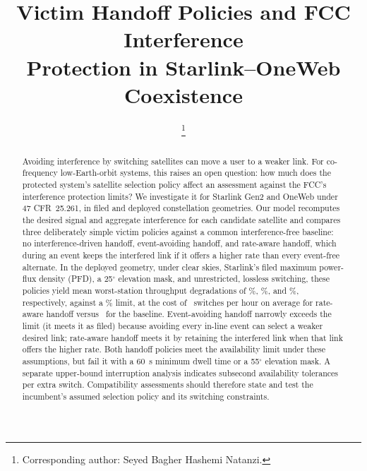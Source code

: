 \documentclass[conference]{IEEEtran}
\begin{document}
\title{Victim Handoff Policies and FCC Interference\\ Protection in Starlink--OneWeb Coexistence}

\author{
\thanks{Corresponding author: Seyed Bagher Hashemi Natanzi.}
}

\maketitle

\begin{abstract}
Avoiding interference by switching satellites can move a user to a weaker
link. For co-frequency low-Earth-orbit systems, this raises an open question:
how much does the protected system's satellite selection
policy affect an assessment against the FCC's interference protection
limits? We investigate it for Starlink Gen2 and OneWeb under 47 CFR~25.261, in
filed and deployed constellation geometries. Our model recomputes the desired signal
and aggregate interference for each candidate satellite and compares three
deliberately simple victim policies against a common interference-free
baseline: no interference-driven handoff, event-avoiding handoff, and rate-aware
handoff, which during an event keeps the interfered link if it offers a higher
rate than every event-free alternate. In the deployed geometry, under clear skies, Starlink's filed
maximum power-flux density (PFD), a 25$^\circ$ elevation mask, and unrestricted, lossless
switching, these policies yield mean worst-station throughput degradations
of \DepGenTwoNoHoDegrPct\%, \DepGenTwoEvAvDegrPct\%, and
\DepGenTwoRateMaxDegrPct\%, respectively, against a
\DegradeLimitPct\% limit, at the cost of \DepDwellRateMaxNTenSwitchesPerHour\
switches per hour on average for rate-aware handoff versus \IntRateMaxBaseSwitchesPerHour\ for
the baseline. Event-avoiding handoff narrowly exceeds the limit
(it meets it as filed) because avoiding every in-line event can select a weaker desired link;
rate-aware handoff meets it by retaining the interfered link when
that link offers the higher rate. Both handoff policies meet the
availability limit under these assumptions, but fail it with a 60~s
minimum dwell time or a 55$^\circ$ elevation mask. A separate upper-bound
interruption analysis indicates subsecond availability tolerances per extra
switch. Compatibility
assessments should therefore state and test the incumbent's assumed selection
policy and its switching constraints.
\end{abstract}
\end{document}
